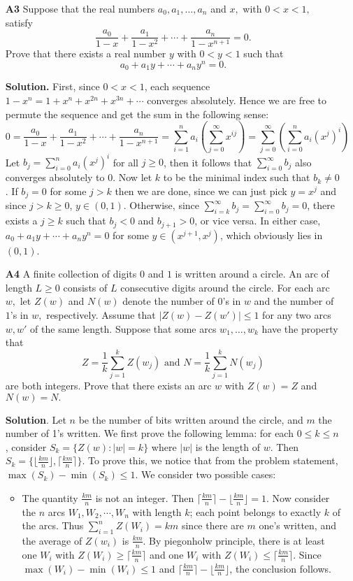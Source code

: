 \documentclass[11pt,a4paper]{article}
\newcommand{\<}{\langle}
\renewcommand{\>}{\rangle}
\begin{document}
\begin{enumerate}
	\item[\textbf{A3}]Suppose that the real numbers $a_0,a_1,\dots,a_n$ and $x,$ with $0<x<1,$ satisfy \[\frac{a_0}{1-x}+\frac{a_1}{1-x^2}+\cdots+\frac{a_n}{1-x^{n+1}}=0.\] Prove that there exists a real number $y$ with $0<y<1$ such that \[a_0+a_1y+\cdots+a_ny^n=0.\]
	
	\textbf{Solution.} First, since $0<x<1$, each sequence $1-x^n=1+x^n+x^{2n}+x^{3n}+\cdots$ converges absolutely. Hence we are free to permute the sequence and get the sum in the following sense: 
	\[0=\frac{a_0}{1-x}+\frac{a_1}{1-x^2}+\cdots+\frac{a_n}{1-x^{n+1}}
	=\sum_{i=1}^n a_i \left(\sum_{j=0}^{\infty} x^{ij}\right)
	=\sum_{j=0}^{\infty} \left(\sum_{i=0}^n a_i(x^{j})^i\right)
	\]
	Let $b_j=\sum_{i=0}^n a_i(x^{j})^i$ for all $j\ge 0$, then it follows that $\sum_{i=0}^\infty b_j$ also converges absolutely to 0. Now let $k$ to be the minimal index such that $b_k\neq 0$. If $b_j=0$ for some $j>k$ then we are done, since we can just pick $y=x^j$ and since $j>k\ge 0$, $y\in (0, 1)$. Otherwise, since $\sum_{i=k}^\infty b_j=\sum_{i=0}^\infty b_j=0$, there exists a $j\ge k$ such that $b_j<0$ and $b_{j+1}>0$, or vice versa. In either case, $a_0+a_1y+\cdots+a_ny^n=0$ for some $y\in (x^{j+1}, x^{j})$, which obviously lies in $(0, 1)$. 
	
	\item[\textbf{A4}] A finite collection of digits $0$ and $1$ is written around a circle. An arc of length $L\ge 0$ consists of $L$ consecutive digits around the circle. For each arc $w,$ let $Z(w)$ and $N(w)$ denote the number of $0$'s in $w$ and the number of $1$'s in $w,$ respectively. Assume that $|Z(w)-Z(w')|\le 1$ for any two arcs $w,w'$ of the same length. Suppose that some arcs $w_1,\dots,w_k$ have the property that \[Z=\frac1k\sum_{j=1}^kZ(w_j)\text{ and }N=\frac1k\sum_{j=1}^k N(w_j)\] are both integers. Prove that there exists an arc $w$ with $Z(w)=Z$ and $N(w)=N.$
	
	\textbf{Solution}. Let $n$ be the number of bits written around the circle, and $m$ the number of 1's written. We first prove the following lemma: for each $0\le k\le n$, consider $S_k=\{Z(w): |w|=k\}$ where $|w|$ is the length of $w$. Then $S_k=\{\lfloor \frac{km}{n}\rfloor, \lceil \frac{km}{n}\rceil\}$. To prove this, we notice that from the problem statement, $\max(S_k)-\min(S_k)\le 1$. 
	We consider two possible cases: 
	\begin{itemize}
		\item The quantity $\frac{km}{n}$ is not an integer. Then $\lceil \frac{km}{n}\rceil-\lfloor \frac{km}{n}\rfloor=1$. Now consider the $n$ arcs $W_1, W_2, \cdots , W_n$ with length $k$; each point belongs to exactly $k$ of the arcs. Thus $\sum_{i=1}^n Z(W_i)=km$ since there are $m$ one's written, and the average of $Z(w_i)$ is $\frac{km}{n}$. By piegonholw principle, there is at least one $W_i$ with $Z(W_i)\ge \lceil \frac{km}{n}\rceil$ and one $W_i$ with $Z(W_i)\le \lceil \frac{km}{n}\rceil$. Since $\max(W_i)-\min(W_i)\le 1$ and $\lceil \frac{km}{n}\rceil-\lfloor \frac{km}{n}\rfloor$, the conclusion follows. 
		

\end{itemize}
\end{enumerate}
\end{document}
